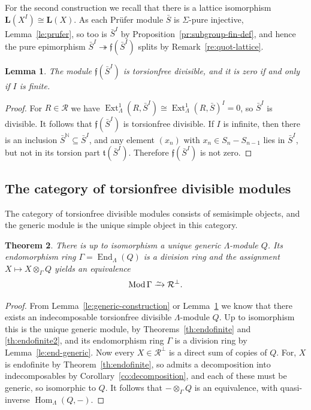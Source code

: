 \documentclass[a4paper]{amsart}
\theoremstyle{plain}
\newtheorem{thm}{Theorem}[section]
\newtheorem{lem}[thm]{Lemma}
\theoremstyle{definition}
\theoremstyle{remark}
\numberwithin{equation}{section}
\newcommand{\End}{\operatorname{End}}
\newcommand{\Ext}{\operatorname{Ext}}
\newcommand{\Hom}{\operatorname{Hom}}
\newcommand{\Mod}{\operatorname{Mod}}
\newcommand{\iso}{\xrightarrow{\raisebox{-.4ex}[0ex][0ex]{$\scriptstyle{\sim}$}}}
\def\R{\mathcal R}
\def\bfL{\mathbf L}
\def\bfL{\mathbf L}
\def\bbN{\mathbb N}
\newcommand{\frt}{\mathfrak t}
\newcommand{\frf}{\mathfrak f}
\begin{document}
For the second construction we recall that there is a lattice isomorphism $\bfL(X^I)\cong\bfL(X)$. As each Prüfer module $\bar S$ is $\Sigma$-pure injective, Lemma~\ref{le:prufer}, so too is $\bar S^I$ by Proposition~\ref{pr:subgroup-fin-def}, and hence the pure epimorphism $\bar S^I\twoheadrightarrow\frf(\bar S^I)$ splits by Remark~\ref{re:quot-lattice}.

\begin{lem}\label{le:generic-construction2} 
The module $\frf(\bar S^I)$ is torsionfree divisible, and it is zero if and only if $I$ is finite.
\end{lem}

\begin{proof}
For $R\in\R$ we have $\Ext^1_\Lambda(R,\bar S^I)\cong\Ext^1_\Lambda(R,\bar S)^I=0$, so $\bar S^I$ is divisible. It follows that $\frf(\bar S^I)$ is torsionfree divisible. If $I$ is infinite, then there is an inclusion $\bar S^{\bbN}\subseteq\bar S^I$, and any element $(x_n)$ with $x_n\in S_n-S_{n-1}$ lies in $\bar{S}^I$, but not in its torsion part $\frt(\bar{S}^I)$. Therefore $\frf(\bar{S}^I)$ is not zero.
\end{proof}

\subsection*{The category of torsionfree divisible modules}

The category of torsionfree divisible modules consists of semisimple objects, and the generic module is the unique simple object in this category.

\begin{thm}
There is up to isomorphism a unique generic $\Lambda$-module $Q$. Its endomorphism ring $\Gamma=\End_\Lambda(Q)$ is a division ring and the assignment $X\mapsto X\otimes_\Gamma Q$ yields an equivalence
\[ \Mod\Gamma \iso \R^\perp. \]
\end{thm}

\begin{proof}
From Lemma~\ref{le:generic-construction} or Lemma~\ref{le:generic-construction2} we know that there exists an indecomposable torsionfree divisible $\Lambda$-module $Q$. Up to isomorphism this is the unique generic module, by Theorems~\ref{th:endofinite} and \ref{th:endofinite2}, and its endomorphism ring $\Gamma$ is a division ring by Lemma~\ref{le:end-generic}. Now every $X\in\R^\perp$ is a direct sum of copies of $Q$. For, $X$ is endofinite by Theorem~\ref{th:endofinite}, so admits a decomposition into indecomposables by Corollary~\ref{co:decomposition}, and each of these must be generic, so isomorphic to $Q$. It follows that $-\otimes_\Gamma Q$ is an equivalence, with quasi-inverse $\Hom_\Lambda(Q,-)$.
\end{proof}
\end{document}
